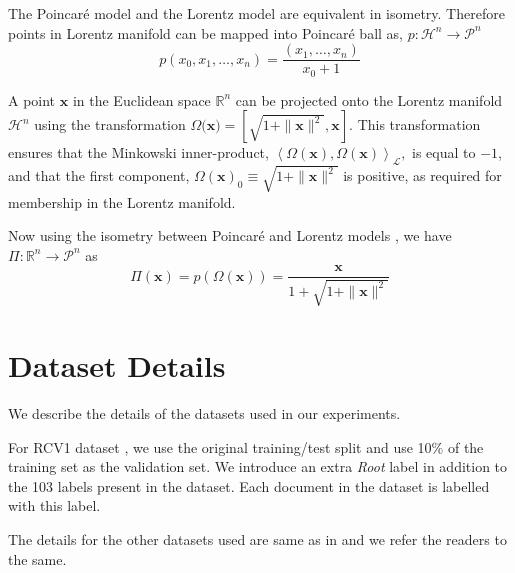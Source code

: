 \documentclass[11pt,a4paper]{article}
\begin{document}
The Poincar\'e model and the Lorentz model are equivalent in isometry. Therefore points in Lorentz manifold can be mapped into Poincar\'e ball as, $p: \mathcal{H}^n \rightarrow \mathcal{P}^n $
$$p(x_0, x_1,\ldots, x_n) = \frac{(x_1, \ldots, x_n)}{x_0 + 1}$$

A point $\mathbf{x}$ in the Euclidean space $\mathbb{R}^n$ can be projected onto the Lorentz manifold $\mathcal{H}^n$ using the transformation $\Omega(\mathbf{x)} = \left[\sqrt{1+\|\mathbf{x}\|^2}, \mathbf{x}\right]$. This transformation ensures that the Minkowski inner-product, $\left\langle\Omega(\mathbf{x}),\Omega(\mathbf{x})\right\rangle_{\mathcal{L}},$ is equal to $-1$, and that the first component, $\Omega(\mathbf{x})_0\equiv\sqrt{1+\|\mathbf{x}\|^2}$ is positive, as required for membership in the Lorentz manifold. 

Now using the isometry between Poincar\'e and Lorentz models \citep{lorentz}, we have $\Pi: \mathbb{R}^n \rightarrow \mathcal{P}^n$ as 
$$\Pi(\mathbf{x}) = p\left(\Omega(\mathbf{x})\right) = \frac{\mathbf{x}}{1+\sqrt{1+\|\mathbf{x}\|^2}}$$

\section{Dataset Details}
We describe the details of the datasets used in our experiments.

For RCV1 dataset \citep{rcv1}, we use the original training/test split and use 10\% of the training set as the validation set. We introduce an extra \textit{Root} label in addition to the 103 labels present in the dataset. Each document in the dataset is labelled with this label.

The details for the other datasets used are same as in \citet{emnlp} and we refer the readers to the same.
\end{document}
